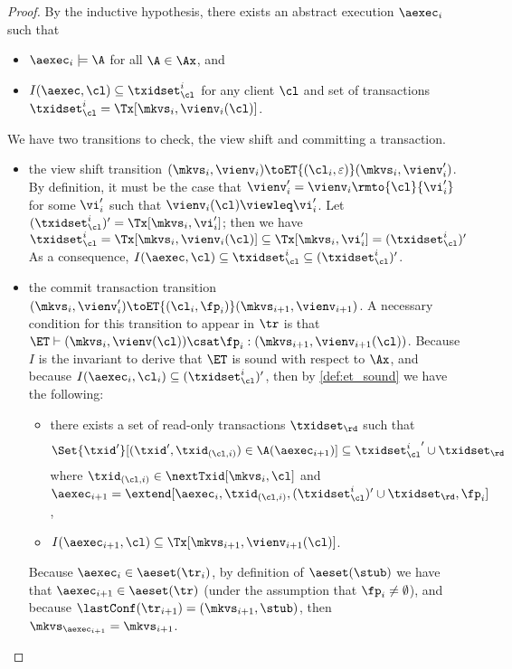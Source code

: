 \begin{proof}
By the inductive hypothesis, there exists an abstract execution \(\aexec_i\) such that  
\begin{itemize}
\item \(\aexec_{i} \models \A\) for all \(\A \in \Ax\), and 
\item \(I(\aexec, \cl) \subseteq \txidset_{\cl}^{i}\) for any client \(\cl\) and set of transactions \(\txidset_{\cl}^{i} = \Tx[\mkvs_{i}, \vienv_{i}(\cl)]\).
\end{itemize}

We have two transitions to check, the view shift and committing a transaction.
\begin{itemize}
\item the view shift transition \((\mkvs_{i}, \vienv_{i}) \toET{(\cl_{i}, \varepsilon)} (\mkvs_{i}, \vienv'_{i})\). 
By definition, it must be the case that \(\vienv'_{i} = \vienv_{i}\rmto{\cl}{\vi'_{i}}\) 
for some \(\vi'_{i}\) such that \(\vienv_{i}(\cl) \viewleq \vi'_{i}\).
Let \((\txidset_{\cl}^{i})' = \Tx[\mkvs_{i}, \vi'_{i}]\); then we have 
\(
\txidset_{\cl}^{i} = \Tx[\mkvs_{i}, \vienv_{i}(\cl)] \subseteq \Tx[\mkvs_{i}, \vi'_{i}] = (\txidset_{\cl}^{i})' \)
As a consequence, \(I(\aexec, \cl) \subseteq \txidset_{\cl}^{i} \subseteq (\txidset_{\cl}^{i})'\).

\item the commit transaction transition $(\mkvs_{i}, \vienv_{i}') \toET{(\cl_{i}, \fp_{i})}
(\mkvs_{i+1}, \vienv_{i+1})$.
A necessary condition for this transition 
to appear in \(\tr\) is that \(\ET \vdash (\mkvs_{i}, \vienv(\cl)) \csat \fp_{i}: (\mkvs_{i+1},\vienv_{i+1}(\cl))\). 
Because \(I\) is the invariant to derive that \(\ET\) is sound with respect to \(\Ax\), 
and because \(I(\aexec_{i}, \cl_{i}) \subseteq (\txidset^{i}_{\cl})'\), 
then by \cref{def:et_sound} we have the following:
\begin{itemize}
\item there exists a set of read-only transactions \(\txidset_\rd\) 
such that 
\[
    \Set{\txid' }[ (\txid', \txid_{(\cl, i)}) \in \A(\aexec_{i+1})] \subseteq {\txidset^{i}_{\cl}}' \cup \txidset_\rd
\]
where 
\(\txid_{(\cl, i)} \in \nextTxid[\mkvs_{i}, \cl]\)
and \(\aexec_{i+1} = \extend[\aexec_{i}, \txid_{(\cl, i)}, (\txidset^{i}_{\cl})' \cup \txidset_\rd, \fp_{i}]\),
\item  \(I(\aexec_{i+1}, \cl) \subseteq \Tx[\mkvs_{i+1}, \vienv_{i+1}(\cl)]\).
\end{itemize} 
Because \(\aexec_{i} \in \aeset(\tr_{i})\), by definition of \(\aeset(\stub)\) we have that 
\(\aexec_{i+1} \in \aeset(\tr)\) (under the assumption that \(\fp_{i} \neq \emptyset\)), 
and because \(\lastConf(\tr_{i+1}) = (\mkvs_{i+1}, \stub)\), then \(\mkvs_{\aexec_{i+1}} = \mkvs_{i+1}\). 


\end{itemize}
\end{proof}
